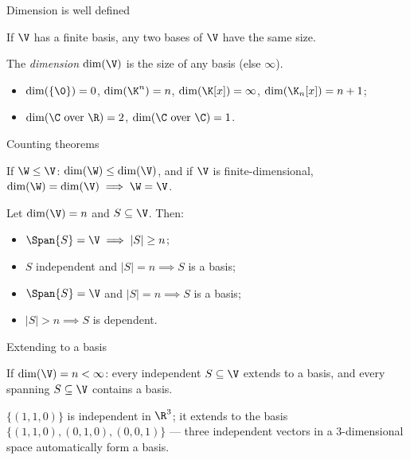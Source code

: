 \begin{frame}{Dimension is well defined}
\begin{theorem}
If $\V$ has a finite basis, any two bases of $\V$ have the same size.
\end{theorem}

\pause

\begin{definition}
The \emph{dimension} $\dim(\V)$ is the size of any basis (else $\infty$).
\end{definition}

\pause

\begin{itemize}
\item $\dim(\{\0\})=0$, \quad $\dim(\K^n)=n$, \quad $\dim(\K[x])=\infty$, \quad $\dim(\K_n[x])=n+1$;
\item $\dim(\C \text{ over } \R)=2$, \quad $\dim(\C \text{ over } \C)=1$.
\end{itemize}
\end{frame}

\begin{frame}{Counting theorems}
\begin{theorem}
If $\W\leq\V$: $\dim(\W)\leq\dim(\V)$, and if $\V$ is finite-dimensional, $\dim(\W)=\dim(\V)\implies\W=\V$.
\end{theorem}

\pause

\begin{theorem}
Let $\dim(\V)=n$ and $S\subseteq\V$. Then:
\begin{itemize}
\item $\Span{S}=\V \implies |S|\geq n$;
\item $S$ independent and $|S|=n \implies S$ is a basis;
\item $\Span{S}=\V$ and $|S|=n \implies S$ is a basis;
\item $|S|>n \implies S$ is dependent.
\end{itemize}
\end{theorem}
\end{frame}

\begin{frame}{Extending to a basis}
\begin{theorem}
If $\dim(\V)=n<\infty$: every independent $S\subseteq\V$ extends to a basis, and every spanning
$S\subseteq\V$ contains a basis.
\end{theorem}

\pause

\begin{example}
$\{(1,1,0)\}$ is independent in $\R^3$; it extends to the basis $\{(1,1,0),(0,1,0),(0,0,1)\}$ — three
independent vectors in a $3$-dimensional space automatically form a basis.
\end{example}
\end{frame}

